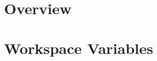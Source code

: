 %
\newpage
\thispagestyle{empty}
\rule{0pt}{10pt}
\newpage

\tableofcontents

\cleardoublepage
{}
     

%
%
\chapter{Overview}
%
%
%
%

%
%
%

%
%
%
\chapter{Workspace Variables}
%
%






